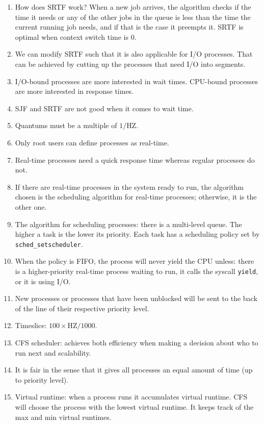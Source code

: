 \documentclass[12pt,a4paper]{article}
\begin{document}
\begin{enumerate}
  \item How does SRTF work? When a new job arrives, the algorithm checks if the time it needs or any of the other jobs in the queue is less than the time the current running job needs, and if that is the case it preempts it. SRTF is optimal when context switch time is 0.
  \item We can modify SRTF such that it is also applicable for I/O processes. That can be achieved by cutting up the processes that need I/O into segments.
  \item I/O-bound processes are more interested in wait times. CPU-bound processes are more interested in response times.
  \item SJF and SRTF are not good when it comes to wait time.
  \item Quantums must be a multiple of $1/\text{HZ}$.
  \item Only root users can define processes as real-time.
  \item Real-time processes need a quick response time whereas regular processes do not.
  \item If there are real-time processes in the system ready to run, the algorithm chosen is the scheduling algorithm for real-time processes; otherwise, it is the other one.
  \item The algorithm for scheduling processes: there is a multi-level queue. The higher a task is the lower its priority. Each task has a scheduling policy set by \texttt{sched\_setscheduler}.
  \item When the policy is FIFO, the process will never yield the CPU unless: there is a higher-priority real-time process waiting to run, it calls the syscall \texttt{yield}, or it is using I/O.
  \item New processes or processes that have been unblocked will be sent to the back of the line of their respective priority level.
  \item Timeslice: $100 \times \text{HZ} / 1000$.
  \item CFS scheduler: achieves both efficiency when making a decision about who to run next and scalability.
  \item It is fair in the sense that it gives all processes an equal amount of time (up to priority level).
  \item Virtual runtime: when a process runs it accumulates virtual runtime. CFS will choose the process with the lowest virtual runtime. It keeps track of the max and min virtual runtimes.

\end{enumerate}
\end{document}
